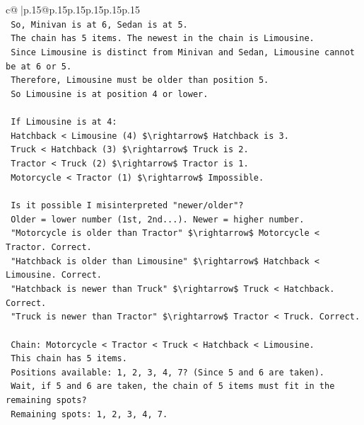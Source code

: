 \documentclass{article}
\begin{document}
{\begin{supertabular}{c@{$\;$}|p{.15\linewidth}@{}p{.15\linewidth}p{.15\linewidth}p{.15\linewidth}p{.15\linewidth}p{.15\linewidth}}
{{{\\ 
\texttt{    So, Minivan is at 6, Sedan is at 5.} \\
\texttt{    The chain has 5 items. The newest in the chain is Limousine.} \\
\texttt{    Since Limousine is distinct from Minivan and Sedan, Limousine cannot be at 6 or 5.} \\
\texttt{    Therefore, Limousine must be older than position 5.} \\
\texttt{    So Limousine is at position 4 or lower.} \\
\\ 
\texttt{    If Limousine is at 4:} \\
\texttt{    Hatchback < Limousine (4) \$\textbackslash{}rightarrow\$ Hatchback is 3.} \\
\texttt{    Truck < Hatchback (3) \$\textbackslash{}rightarrow\$ Truck is 2.} \\
\texttt{    Tractor < Truck (2) \$\textbackslash{}rightarrow\$ Tractor is 1.} \\
\texttt{    Motorcycle < Tractor (1) \$\textbackslash{}rightarrow\$ Impossible.} \\
\\ 
\texttt{    Is it possible I misinterpreted "newer/older"?} \\
\texttt{    Older = lower number (1st, 2nd...). Newer = higher number.} \\
\texttt{    "Motorcycle is older than Tractor" \$\textbackslash{}rightarrow\$ Motorcycle < Tractor. Correct.} \\
\texttt{    "Hatchback is older than Limousine" \$\textbackslash{}rightarrow\$ Hatchback < Limousine. Correct.} \\
\texttt{    "Hatchback is newer than Truck" \$\textbackslash{}rightarrow\$ Truck < Hatchback. Correct.} \\
\texttt{    "Truck is newer than Tractor" \$\textbackslash{}rightarrow\$ Tractor < Truck. Correct.} \\
\\ 
\texttt{    Chain: Motorcycle < Tractor < Truck < Hatchback < Limousine.} \\
\texttt{    This chain has 5 items.} \\
\texttt{    Positions available: 1, 2, 3, 4, 7? (Since 5 and 6 are taken).} \\
\texttt{    Wait, if 5 and 6 are taken, the chain of 5 items must fit in the remaining spots?} \\
\texttt{    Remaining spots: 1, 2, 3, 4, 7.} \\
}}}
\end{supertabular}}
\end{document}
